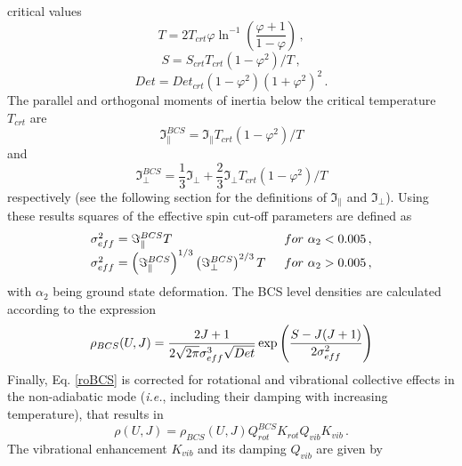 critical values 
\begin{equation}
T=2T_{crt}\varphi\ln^{-1}\left(\frac{\varphi+1}{1-\varphi}\right)\,,
\label{Tign}
\end{equation}
\begin{equation}
S=S_{crt}T_{crt}(1-\varphi^{2})/T\,,  \label{Sign}
\end{equation}
\begin{equation}
Det=Det_{crt}(1-\varphi^{2})(1+\varphi^{2})^{2}\,.  \label{Detign}
\end{equation}
The parallel and orthogonal moments of inertia below the critical
temperature $T_{crt}$ are 
\begin{equation}
\Im_{\parallel}^{BCS}=\Im_{\parallel}T_{crt}(1-\varphi^{2})/T
\label{momparign}
\end{equation}
and 
\begin{equation}
\Im_{\perp}^{BCS}=\frac{1}{3}\Im_{\perp}+\frac{2}{3}\Im_{\perp}T_{crt}(1-%
\varphi^{2})/T  \label{momortign}
\end{equation}
respectively (see the following section for the definitions of $%
\Im_{\parallel}$ and $\Im_{\perp}$). Using these results squares of the
effective spin cut-off parameters are defined as 
\begin{equation}
\begin{array}{ll}
\sigma_{eff}^{2}=\Im_{\parallel}^{BCS}T & \,\,\, for\,\,\alpha_{2}<0.005\,,
\\ 
\sigma_{eff}^{2}=\left(\Im_{\parallel}^{BCS}\right)^{1/3}\left(\Im_{%
\perp}^{BCS}\right)^{2/3}T & \,\,\, for\,\,\alpha_{2}>0.005\,,%
\end{array}
\label{sigeffign}
\end{equation}
with $\alpha_{2}$ being ground state deformation. The BCS%
 level densities%
 are calculated according to the expression 
\begin{equation}
\rho_{BCS}(U,J)=%
\frac{2J+1}{2\sqrt{2\pi}\sigma_{eff}^{3}\sqrt{Det}}\exp\left(\frac{S-J(J+1)}{%
2\sigma_{eff}^{2}}\right)  \label{roBCS}
\end{equation}
Finally, Eq. \ref{roBCS} is corrected for rotational and vibrational
collective effects in the non-adiabatic mode (\textit{i.e.}, including their
damping with increasing temperature), that results in 
\begin{equation}
\rho(U,J)=\rho_{BCS}(U,J)Q_{rot}^{BCS}K_{rot}Q_{vib}K_{vib}\,.
\label{roBCScol}
\end{equation}
The vibrational enhancement $K_{vib}$ and its damping $Q_{vib}$ are given by
